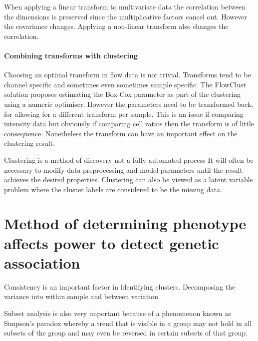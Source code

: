 When applying a linear transform to multivariate data the correlation between the dimensions is preserved since the multiplicative factors cancel out.
However the covariance changes.
Applying a non-linear transform also changes the correlation.

\paragraph{Combining transforms with clustering}

Choosing an optimal transform in flow data is not trivial.
Transforms tend to be channel specific and sometimes even sometimes sample specific.
The FlowClust solution proposes estimating the Box-Cox parameter as part of the clustering using a numeric optimiser.
However the parameters need to be transformed back, for allowing for a different transform per sample.
This is an issue if comparing intensity data but obviously if comparing cell ratios then the transform is of little consequence.
Nonetheless the transform can have an important effect on the clustering result.

Clustering is a method of discovery not a fully automated process
It will often be necessary to modify data preprocessing and model parameters until the result achieves the desired properties.  
Clustering can also be viewed as a latent variable problem where the cluster labels are considered to be the missing data.




\section{ Method of determining phenotype affects power to detect genetic association }


Consistency is an important factor in identifying clusters.
Decomposing the variance into within sample and between variation

Subset analysis is also very important because of a phenomenon known as Simpson’s paradox whereby a trend that is visible in a group may not hold in all subsets of the group and may even be reversed in certain subsets of that group.


